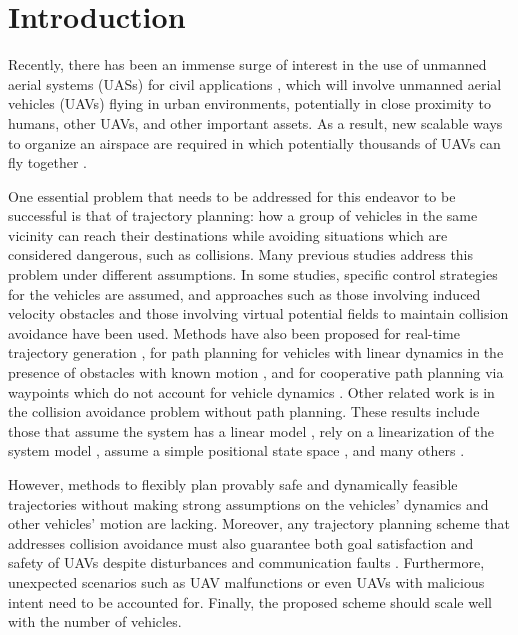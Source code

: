 \section{Introduction \label{sec:introduction}}
Recently, there has been an immense surge of interest in the use of unmanned aerial systems (UASs) for civil applications \cite{Tice91, Debusk10, Amazon16, AUVSI16, BBC16}, which will involve unmanned aerial vehicles (UAVs) flying in urban environments, potentially in close proximity to humans, other UAVs, and other important assets. As a result, new scalable ways to organize an airspace are required in which potentially thousands of UAVs can fly together \cite{FAA13, Kopardekar16}.

One essential problem that needs to be addressed for this endeavor to be successful is that of trajectory planning: how a group of vehicles in the same vicinity can reach their destinations while avoiding situations which are considered dangerous, such as collisions. Many previous studies address this problem under different assumptions. In some studies, specific control strategies for the vehicles are assumed, and approaches such as those involving induced velocity obstacles \cite{Fiorini98, Chasparis05, Vandenberg08,Wu2012} and those involving virtual potential fields to maintain collision avoidance \cite{Olfati-Saber2002, Chuang07} have been used. Methods have also been proposed for real-time trajectory generation \cite{Feng-LiLian2002}, for path planning for vehicles with linear dynamics in the presence of obstacles with known motion \cite{Ahmadzadeh2009}, and for cooperative path planning via waypoints which do not account for vehicle dynamics \cite{Bellingham}. Other related work is in the collision avoidance problem without path planning. These results include those that assume the system has a linear model \cite{Beard2003, Schouwenaars2004, Stipanovic2007}, rely on a linearization of the system model \cite{Massink2001, Althoff2011}, assume a simple positional state space \cite{Lin2015}, and many others \cite{Lalish2008, Hoffmann2008, Chen2016}.

However, methods to flexibly plan provably safe and dynamically feasible trajectories without making strong assumptions on the vehicles' dynamics and other vehicles' motion are lacking. Moreover, any trajectory planning scheme that addresses collision avoidance must also guarantee both goal satisfaction and safety of UAVs despite disturbances and communication faults \cite{Kopardekar16}. Furthermore, unexpected scenarios such as UAV malfunctions or even UAVs with malicious intent need to be accounted for. Finally, the proposed scheme should scale well with the number of vehicles.

